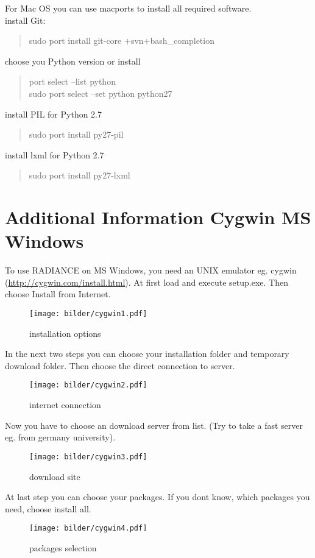 \documentclass[10pt,a4paper]{report}
\begin{document}
For Mac OS you can use macports to install all required software.\\
install Git:
\begin{quote}
sudo port install git-core $+$svn$+$bash\_completion
\end{quote}
choose you Python version or install
\begin{quote}
port select --list python\\
sudo port select --set python python27
\end{quote}
install PIL for Python 2.7
\begin{quote}
sudo port install py27-pil
\end{quote}
install lxml for Python 2.7
\begin{quote}
sudo port install py27-lxml
\end{quote}

\section{Additional Information Cygwin MS Windows}
To use RADIANCE on MS Windows, you need an UNIX emulator eg. cygwin (\url{http://cygwin.com/install.html}). At first load and execute setup.exe. Then choose Install from Internet.

\begin{figure}[H]
\centering
\texttt{[image: bilder/cygwin1.pdf]} 
\caption{installation options}
\end{figure}

In the next two steps you can choose your installation folder and temporary download folder. Then choose the direct connection to server.

\begin{figure}[H]
\centering
\texttt{[image: bilder/cygwin2.pdf]} 
\caption{internet connection}
\end{figure}

Now you have to choose an download server from list. (Try to take a fast server eg. from germany university).

\begin{figure}[H]
\centering
\texttt{[image: bilder/cygwin3.pdf]} 
\caption{download site}
\end{figure}

At last step you can choose your packages. If you dont know, which packages you need, choose install all.

\begin{figure}[H]
\centering
\texttt{[image: bilder/cygwin4.pdf]} 
\caption{packages selection}
\end{figure}
\end{document}
